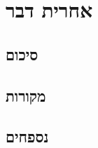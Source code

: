 \documentclass{article}
\begin{document}
\newpage
\section{אחרית דבר}
{}
\subsection*{סיכום}
{}
\subsection*{מקורות}
\begin{otherlanguage}{English}
    \nocite{*}
    \printbibliography[heading=none]
\end{otherlanguage}
{}
\subsection*{נספחים}
\end{document}
